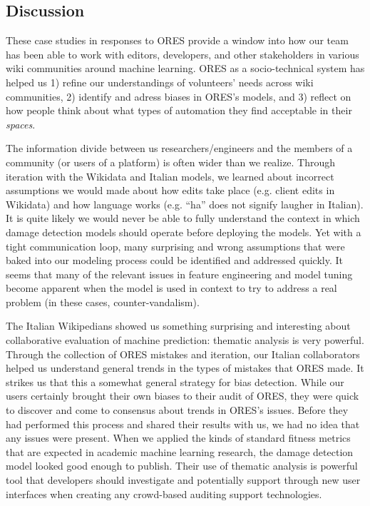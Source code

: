 \subsection{Discussion}
These case studies in responses to ORES provide a window into how our team has been able to work with editors, developers, and other stakeholders in various wiki communities around machine learning. ORES as a socio-technical system has helped us 1) refine our understandings of volunteers' needs across wiki communities, 2) identify and adress biases in ORES's models, and 3) reflect on how people think about what types of automation they find acceptable in their \emph{spaces}.

The information divide between us researchers/engineers and the members of a community (or users of a platform) is often wider than we realize.  Through iteration with the Wikidata and Italian models, we learned about incorrect assumptions we would made about how edits take place (e.g. client edits in Wikidata) and how language works (e.g. ``ha'' does not signify laugher in Italian).  It is quite likely we would never be able to fully understand the context in which damage detection models should operate before deploying the models.  Yet with a tight communication loop, many surprising and wrong assumptions that were baked into our modeling process could be identified and addressed quickly.  It seems that many of the relevant issues in feature engineering and model tuning become apparent when the model is used in context to try to address a real problem (in these cases, counter-vandalism).

The Italian Wikipedians showed us something surprising and interesting about collaborative evaluation of machine prediction: thematic analysis is very powerful.  Through the collection of ORES mistakes and iteration, our Italian collaborators helped us understand general trends in the types of mistakes that ORES made.  It strikes us that this a somewhat general strategy for bias detection.  While our users certainly brought their own biases to their audit of ORES, they were quick to discover and come to consensus about trends in ORES's issues.  Before they had performed this process and shared their results with us, we had no idea that any issues were present. When we applied the kinds of standard fitness metrics that are expected in academic machine learning research, the damage detection model looked good enough to publish.  Their use of thematic analysis is powerful tool that developers should investigate and potentially support through new user interfaces when creating any crowd-based auditing support technologies.

